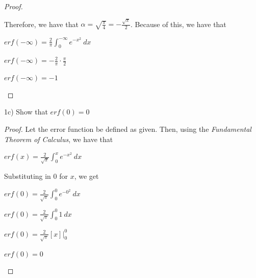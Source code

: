 \documentclass[12pt, executivepaper]{article}
\begin{document}
\begin{flushleft}
\begin{proof}
\begin{center}
\end{center}

Therefore, we have that $\alpha=\sqrt{\frac{\pi}{4}}=-\frac{\sqrt{\pi}}{2}$. Because of this, we have that

\begin{center}

$erf(-\infty)=\frac{2}{\pi} \int_{0}^{-\infty} e^{-x^{2}} \ dx$

\vspace{2mm}

$erf(-\infty)=-\frac{2}{\pi} \cdot \frac{\pi}{2}$

\vspace{2mm}

$erf(-\infty)=-1$

\end{center}

\end{proof}

\end{flushleft}

\pagebreak

\vspace*{-40mm}

\begin{flushleft}

1c) Show that $erf(0)=0$

\begin{proof}

Let the error function be defined as given. Then, using the \textit{Fundamental Theorem of Calculus}, we have that

\begin{center}

$erf(x)=\frac{2}{\sqrt{\pi}} \int_{0}^{x} e^{-x^{2}} \ dx$

\end{center}

Substituting in $0$ for $x$, we get

\begin{center}

$erf(0)=\frac{2}{\sqrt{\pi}} \int_{0}^{0} e^{-0^{2}} \ dx$

\vspace{2mm}

$erf(0)=\frac{2}{\sqrt{\pi}} \int_{0}^{0} 1 \ dx$

\vspace{2mm}

$erf(0)=\frac{2}{\sqrt{\pi}} [x] \Big|_{0}^{0}$

\vspace{2mm}

$erf(0)=0$

\end{center}

\end{proof}

\end{flushleft}
\end{document}
